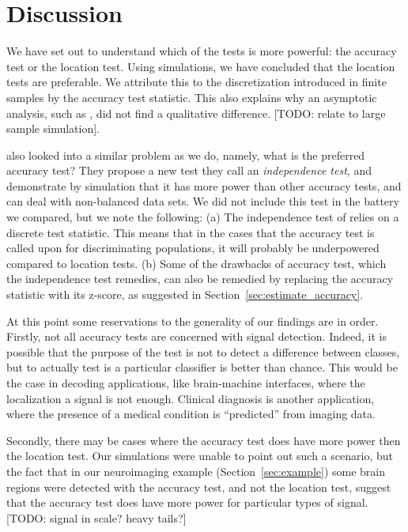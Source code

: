 \documentclass[12pt,a4paper]{article}
\begin{document}
\section{Discussion}
\label{sec:discussion}


We have set out to understand which of the tests is more powerful: the accuracy test or the location test. 
Using simulations, we have concluded that the location tests are preferable. 
We attribute this to the discretization introduced in finite samples by the accuracy test statistic. 
This also explains why an asymptotic analysis, such as \cite{ramdas_classification_2016}, did not find a qualitative difference. [TODO: relate to large sample simulation].

\cite{olivetti_statistical_2014} also looked into a similar problem as we do, namely, what is the preferred accuracy test?
They propose a new test they call an \emph{independence test}, and demonstrate by simulation that it has more power than other accuracy tests, and can deal with non-balanced data sets. 
We did not include this test in the battery we compared, but we note the following: 
(a) The independence test of \cite{olivetti_statistical_2014} relies on a discrete test statistic. This means that in the cases that the accuracy test is called upon for discriminating populations, it will probably be underpowered compared to location tests. 
(b) Some of the drawbacks of accuracy test, which the independence test remedies, can also be remedied by replacing the accuracy statistic with its z-score, as suggested in Section~\ref{sec:estimate_accuracy}.

At this point some reservations to the generality of our findings are in order. 
Firstly, not all accuracy tests are concerned with signal detection.
Indeed, it is possible that the purpose of the test is not to detect a difference between classes, but to actually test is a particular classifier is better than chance. 
This would be the case in decoding applications, like brain-machine interfaces, where the localization a signal is not enough. 
Clinical diagnosis is another application, where the presence of a medical condition is ``predicted'' from imaging data. \citep[e.g.][]{olivetti_induction_2012,wager_fmri-based_2013}


Secondly, there may be cases where the accuracy test does have more power then the location test. 
Our simulations were unable to point out such a scenario, but the fact that in our neuroimaging example (Section~\ref{sec:example}) some brain regions were detected with the accuracy test, and not the location test, suggest that the accuracy test does have more power for particular types of signal. 
[TODO: signal in scale? heavy tails?]
\end{document}
